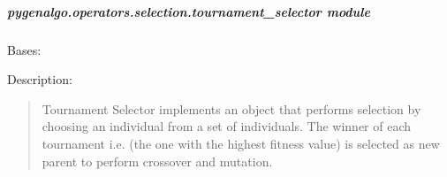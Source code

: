 \documentclass[letterpaper,10pt,english]{sphinxmanual}
\begin{document}
\subparagraph{pygenalgo.operators.selection.tournament\_selector module}
\label{\detokenize{pygenalgo.operators.selection:module-pygenalgo.operators.selection.tournament_selector}}\label{\detokenize{pygenalgo.operators.selection:pygenalgo-operators-selection-tournament-selector-module}}

\begin{fulllineitems}
\label{\detokenize{pygenalgo.operators.selection:pygenalgo.operators.selection.tournament_selector.TournamentSelector}}
\pysigstartsignatures
\pysiglinewithargsret
{}
{\sphinxparamcomma {}}
{}
\pysigstopsignatures
\sphinxAtStartPar
Bases: {\hyperref[\detokenize{pygenalgo.operators.selection:pygenalgo.operators.selection.select_operator.SelectionOperator}]{}}

\sphinxAtStartPar
Description:
\begin{quote}

\sphinxAtStartPar
Tournament Selector implements an object that performs selection by choosing
an individual from a set of individuals. The winner of each tournament i.e.
(the one with the highest fitness value) is selected as new parent to perform
crossover and mutation.
\end{quote}


\end{fulllineitems}
\end{document}
